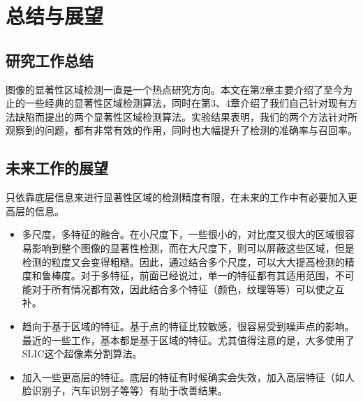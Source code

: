 \chapter{总结与展望}
\section{研究工作总结}
图像的显著性区域检测一直是一个热点研究方向。本文在第2章主要介绍了至今为止的一些经典的显著性区域检测算法，同时在第3、4章介绍了我们自己针对现有方法缺陷而提出的两个显著性区域检测算法。实验结果表明，我们的两个方法针对所观察到的问题，都有非常有效的作用，同时也大幅提升了检测的准确率与召回率。
\section{未来工作的展望}
只依靠底层信息来进行显著性区域的检测精度有限，在未来的工作中有必要加入更高层的信息。
\begin{itemize}
\item 多尺度，多特征的融合。在小尺度下，一些很小的，对比度又很大的区域很容易影响到整个图像的显著性检测，而在大尺度下，则可以屏蔽这些区域，但是检测的粒度又会变得粗糙。因此，通过结合多个尺度，可以大大提高检测的精度和鲁棒度。对于多特征，前面已经说过，单一的特征都有其适用范围，不可能对于所有情况都有效，因此结合多个特征（颜色，纹理等等）可以使之互补。
\item 趋向于基于区域的特征。基于点的特征比较敏感，很容易受到噪声点的影响。最近的一些工作，基本都是基于区域的特征。尤其值得注意的是，大多使用了SLIC\cite{achanta2010slic}这个超像素分割算法。
\item 加入一些更高层的特征。底层的特征有时候确实会失效，加入高层特征（如人脸识别子，汽车识别子等等）有助于改善结果。
\end{itemize}